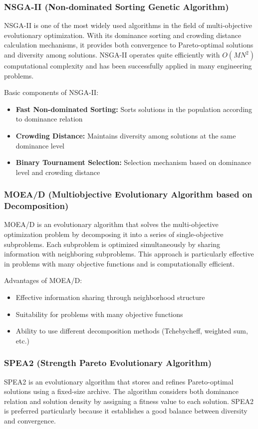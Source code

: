 \subsubsection{NSGA-II (Non-dominated Sorting Genetic Algorithm)}
NSGA-II is one of the most widely used algorithms in the field of multi-objective evolutionary optimization. With its dominance sorting and crowding distance calculation mechanisms, it provides both convergence to Pareto-optimal solutions and diversity among solutions. NSGA-II operates quite efficiently with $O(MN^2)$ computational complexity and has been successfully applied in many engineering problems.

Basic components of NSGA-II:
\begin{itemize}
    \item \textbf{Fast Non-dominated Sorting:} Sorts solutions in the population according to dominance relation
    \item \textbf{Crowding Distance:} Maintains diversity among solutions at the same dominance level
    \item \textbf{Binary Tournament Selection:} Selection mechanism based on dominance level and crowding distance
\end{itemize}

\subsubsection{MOEA/D (Multiobjective Evolutionary Algorithm based on Decomposition)}
MOEA/D is an evolutionary algorithm that solves the multi-objective optimization problem by decomposing it into a series of single-objective subproblems. Each subproblem is optimized simultaneously by sharing information with neighboring subproblems. This approach is particularly effective in problems with many objective functions and is computationally efficient.

Advantages of MOEA/D:
\begin{itemize}
    \item Effective information sharing through neighborhood structure
    \item Suitability for problems with many objective functions
    \item Ability to use different decomposition methods (Tchebycheff, weighted sum, etc.)
\end{itemize}

\subsubsection{SPEA2 (Strength Pareto Evolutionary Algorithm)}
SPEA2 is an evolutionary algorithm that stores and refines Pareto-optimal solutions using a fixed-size archive. The algorithm considers both dominance relation and solution density by assigning a fitness value to each solution. SPEA2 is preferred particularly because it establishes a good balance between diversity and convergence.

